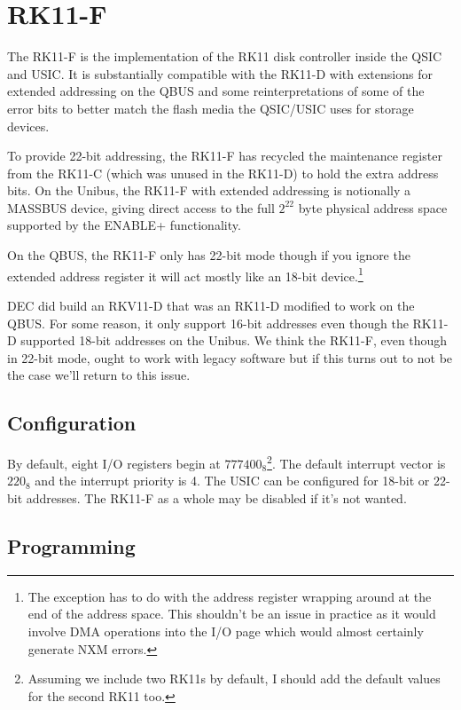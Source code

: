 %

\chapter{RK11-F}

The RK11-F is the implementation of the RK11 disk controller inside
the QSIC and USIC.  It is substantially compatible with the RK11-D
with extensions for extended addressing on the QBUS and some
reinterpretations of some of the error bits to better match the flash
media the QSIC/USIC uses for storage devices.

To provide 22-bit addressing, the RK11-F has recycled the maintenance
register from the RK11-C (which was unused in the RK11-D) to hold the
extra address bits.  On the Unibus, the RK11-F with extended
addressing is notionally a MASSBUS device, giving direct access to the
full $2^{22}$ byte physical address space supported by the ENABLE+
functionality.

On the QBUS, the RK11-F only has 22-bit mode though if you ignore the
extended address register it will act mostly like an 18-bit
device.\footnote{The exception has to do with the address register
  wrapping around at the end of the address space.  This shouldn't be
  an issue in practice as it would involve DMA operations into the I/O
  page which would almost certainly generate NXM errors.}

DEC did build an RKV11-D that was an RK11-D modified to work on the
QBUS.  For some reason, it only support 16-bit addresses even though
the RK11-D supported 18-bit addresses on the Unibus.  We think the
RK11-F, even though in 22-bit mode, ought to work with legacy software
but if this turns out to not be the case we'll return to this issue.


\section{Configuration}

By default, eight I/O registers begin at $777400_8$\footnote{Assuming
  we include two RK11s by default, I should add the default values for
  the second RK11 too.}.  The default interrupt vector is $220_8$ and
the interrupt priority is 4.  The USIC can be configured for 18-bit or
22-bit addresses.  The RK11-F as a whole may be disabled if it's not
wanted.

\section{Programming}


